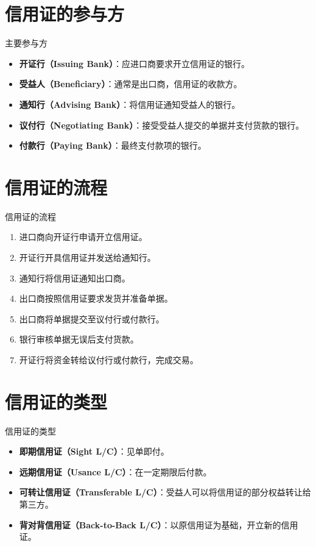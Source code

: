 \documentclass[12pt]{beamer}
\begin{document}
\section{信用证的参与方}
\begin{frame}{主要参与方}
    \begin{itemize}
        \item \textbf{开证行（Issuing Bank）}：应进口商要求开立信用证的银行。
        \item \textbf{受益人（Beneficiary）}：通常是出口商，信用证的收款方。
        \item \textbf{通知行（Advising Bank）}：将信用证通知受益人的银行。
        \item \textbf{议付行（Negotiating Bank）}：接受受益人提交的单据并支付货款的银行。
        \item \textbf{付款行（Paying Bank）}：最终支付款项的银行。
    \end{itemize}
\end{frame}

\section{信用证的流程}
\begin{frame}{信用证的流程}
    \begin{enumerate}
        \item 进口商向开证行申请开立信用证。
        \item 开证行开具信用证并发送给通知行。
        \item 通知行将信用证通知出口商。
        \item 出口商按照信用证要求发货并准备单据。
        \item 出口商将单据提交至议付行或付款行。
        \item 银行审核单据无误后支付货款。
        \item 开证行将资金转给议付行或付款行，完成交易。
    \end{enumerate}
\end{frame}

\section{信用证的类型}
\begin{frame}{信用证的类型}
    \begin{itemize}
        \item \textbf{即期信用证（Sight L/C）}：见单即付。
        \item \textbf{远期信用证（Usance L/C）}：在一定期限后付款。
        \item \textbf{可转让信用证（Transferable L/C）}：受益人可以将信用证的部分权益转让给第三方。
        \item \textbf{背对背信用证（Back-to-Back L/C）}：以原信用证为基础，开立新的信用证。
    \end{itemize}
\end{frame}
\end{document}
